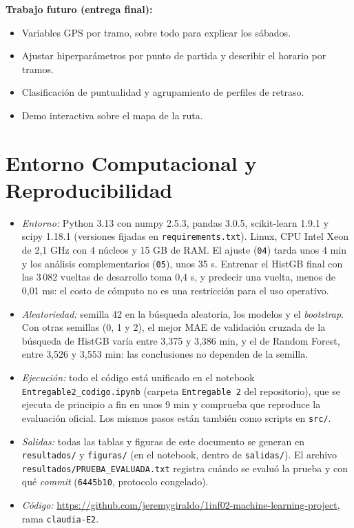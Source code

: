 \documentclass[conference,spanish]{IEEEtran}
\begin{document}
\textbf{Trabajo futuro (entrega final):}
\begin{itemize}
    \item Variables GPS por tramo, sobre todo para explicar los sábados.
    \item Ajustar hiperparámetros por punto de partida y describir el horario por tramos.
    \item Clasificación de puntualidad y agrupamiento de perfiles de retraso.
    \item Demo interactiva sobre el mapa de la ruta.
\end{itemize}

\section{Entorno Computacional y Reproducibilidad}
\begin{itemize}
    \item \emph{Entorno:} Python 3.13 con numpy 2.5.3, pandas 3.0.5, scikit-learn 1.9.1 y scipy 1.18.1 (versiones fijadas en \texttt{requirements.txt}). Linux, CPU Intel Xeon de 2,1 GHz con 4 núcleos y 15 GB de RAM. El ajuste (\texttt{04}) tarda unos 4 min y los análisis complementarios (\texttt{05}), unos 35 s. Entrenar el HistGB final con las 3\,082 vueltas de desarrollo toma 0,4 s, y predecir una vuelta, menos de 0,01 ms: el costo de cómputo no es una restricción para el uso operativo.
    \item \emph{Aleatoriedad:} semilla 42 en la búsqueda aleatoria, los modelos y el \textit{bootstrap}. Con otras semillas (0, 1 y 2), el mejor MAE de validación cruzada de la búsqueda de HistGB varía entre 3,375 y 3,386 min, y el de Random Forest, entre 3,526 y 3,553 min: las conclusiones no dependen de la semilla.
    \item \emph{Ejecución:} todo el código está unificado en el notebook \texttt{Entregable2\_codigo.ipynb} (carpeta \texttt{Entregable 2} del repositorio), que se ejecuta de principio a fin en unos 9 min y comprueba que reproduce la evaluación oficial. Los mismos pasos están también como scripts en \texttt{src/}.
    \item \emph{Salidas:} todas las tablas y figuras de este documento se generan en \texttt{resultados/} y \texttt{figuras/} (en el notebook, dentro de \texttt{salidas/}). El archivo \texttt{resultados/PRUEBA\_EVALUADA.txt} registra cuándo se evaluó la prueba y con qué \textit{commit} (\texttt{6445b10}, protocolo congelado).
    \item \emph{Código:} \url{https://github.com/jeremygiraldo/1inf02-machine-learning-project}, rama \texttt{claudia-E2}.
\end{itemize}
\end{document}
